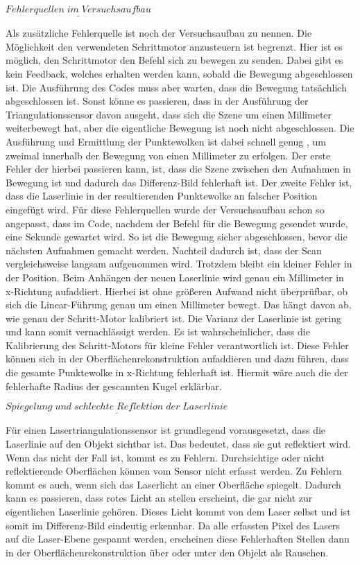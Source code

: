 		$\underline{Fehlerquellen \; im \; Versuchsaufbau}$
		
		Als zusätzliche Fehlerquelle ist noch der Versuchsaufbau zu nennen. Die Möglichkeit den verwendeten Schrittmotor anzusteuern ist begrenzt. Hier ist es möglich, den Schrittmotor den Befehl sich zu bewegen zu senden. Dabei gibt es kein Feedback, welches erhalten werden kann, sobald die Bewegung abgeschlossen ist. Die Ausführung des Codes muss aber warten, dass die Bewegung tatsächlich abgeschlossen ist. Sonst könne es passieren, dass in der Ausführung der Triangulationssensor davon ausgeht, dass sich die Szene um einen Millimeter weiterbewegt hat, aber die eigentliche Bewegung ist noch nicht abgeschlossen. Die Ausführung und Ermittlung der Punktewolken ist dabei schnell genug , um zweimal innerhalb der Bewegung von einen Millimeter zu erfolgen. Der erste Fehler der hierbei passieren kann, ist, dass die Szene zwischen den Aufnahmen in Bewegung ist und dadurch das Differenz-Bild fehlerhaft ist. Der zweite Fehler ist, dass die Laserlinie in der resultierenden Punktewolke an falscher Position eingefügt wird. Für diese Fehlerquellen wurde der Versuchsaufbau schon so angepasst, dass im Code, nachdem der Befehl für die Bewegung gesendet wurde, eine Sekunde gewartet wird. So ist die Bewegung sicher abgeschlossen, bevor die nächsten Aufnahmen gemacht werden. Nachteil dadurch ist, dass der Scan vergleichsweise langsam aufgenommen wird. Trotzdem bleibt ein kleiner Fehler in der Position. Beim Anhängen der neuen Laserlinie wird genau ein Millimeter in x-Richtung aufaddiert. Hierbei ist ohne größeren Aufwand nicht überprüfbar, ob sich die Linear-Führung genau um einen Millimeter bewegt. Das hängt davon ab, wie genau der Schritt-Motor kalibriert ist. Die Varianz der Laserlinie ist gering und kann somit vernachlässigt werden. Es ist wahrscheinlicher, dass die Kalibrierung des Schritt-Motors für kleine Fehler verantwortlich ist. Diese Fehler können sich in der Oberflächenrekonstruktion aufaddieren und dazu führen, dass die gesamte Punktewolke in x-Richtung fehlerhaft ist. Hiermit wäre auch die der fehlerhafte Radius der gescannten Kugel erklärbar.
		
		$\underline{Spiegelung \; und \; schlechte \; Reflektion \; der \; Laserlinie}$
		
		Für einen Lasertriangulationssensor ist grundlegend vorausgesetzt, dass die Laserlinie auf den Objekt sichtbar ist. Das bedeutet, dass sie gut reflektiert wird. Wenn das nicht der Fall ist, kommt es zu Fehlern. Durchsichtige oder nicht reflektierende Oberflächen können vom Sensor nicht erfasst werden. Zu Fehlern kommt es auch, wenn sich das Laserlicht an einer Oberfläche spiegelt. Dadurch kann es passieren, dass rotes Licht an stellen erscheint, die gar nicht zur eigentlichen Laserlinie gehören. Dieses Licht kommt von dem Laser selbst und ist somit im Differenz-Bild eindeutig erkennbar. Da alle erfassten Pixel des Lasers auf die Laser-Ebene gespannt werden, erscheinen diese Fehlerhaften Stellen dann in der Oberflächenrekonstruktion über oder unter den Objekt als Rauschen. 